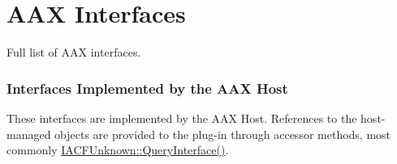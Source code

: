 \hypertarget{a00844}{}\section{A\+AX Interfaces}
\label{a00844}
Full list of A\+AX interfaces. 

\hypertarget{aax_host_implementation}{}\subsubsection{Interfaces Implemented by the A\+A\+X Host}\label{aax_host_implementation}
These interfaces are implemented by the A\+AX Host. References to the host-\/managed objects are provided to the plug-\/in through accessor methods, most commonly \mbox{\hyperlink{a01409_a8b7f0ae9c78d007ca76aa462ebe53135}{I\+A\+C\+F\+Unknown\+::\+Query\+Interface()}}.


